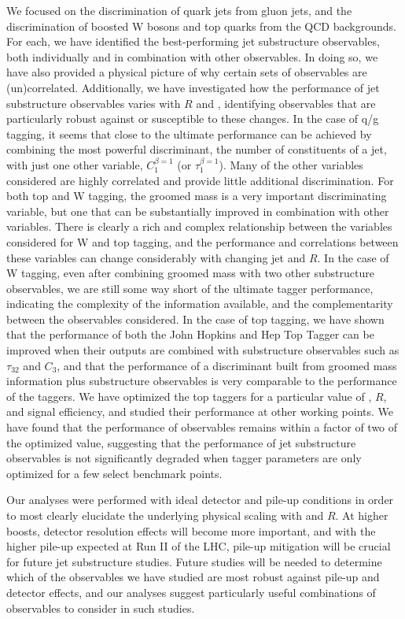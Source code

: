 We focused on the discrimination of quark jets from gluon jets, and the discrimination of boosted W bosons and top quarks from the QCD backgrounds. For each, we have identified the best-performing jet substructure observables, both individually and in combination with other observables. In doing so, we have also provided a physical picture of why certain sets of observables are (un)correlated. Additionally, we have investigated how the performance of jet substructure observables varies with $R$ and \pt, identifying observables that are particularly robust against or susceptible to these changes. In the case of q/g tagging, it seems that close to the ultimate performance can be achieved by combining the most powerful discriminant, the number of constituents of a jet, with just one other variable, $C_1^{\beta =1}$ (or $\tau_1^{\beta=1}$). Many of the other variables considered are highly correlated and provide little additional discrimination. For both top and W tagging, the groomed mass is a very important discriminating variable, but one that can be substantially improved in combination with other variables. There is clearly a rich and complex relationship between the variables considered for W and top tagging, and the performance and correlations between these variables can change considerably with changing jet \pt and $R$. In the case of W tagging, even after combining groomed mass with two other substructure observables, we are still some way short of the ultimate tagger performance, indicating the complexity of the information available, and the complementarity between the observables considered. In the case of top tagging, we have shown that the performance of both the John Hopkins and Hep Top Tagger can be improved when their outputs are combined with substructure observables such as $\tau_{32}$ and $C_{3}$, and that the performance of a discriminant built from groomed mass information plus substructure observables is very comparable to the performance of the taggers.  We have optimized the top taggers for a particular value of \pt, $R$, and signal efficiency, and studied their performance at other working points. We have found that the performance of observables remains within a factor of two of the optimized value, suggesting that the performance of jet substructure observables is not significantly degraded when tagger parameters are only optimized for a few select benchmark points.

Our analyses were performed with ideal detector and pile-up conditions in order to most clearly elucidate the underlying physical scaling with \pt and $R$. At higher boosts, detector resolution effects will become more important, and with the higher pile-up expected at Run II of the LHC, pile-up mitigation will be crucial for future jet substructure studies. Future studies will be needed to determine which of the observables we have studied are most robust against pile-up and detector effects, and our analyses suggest particularly useful combinations of observables to consider in such studies. 

